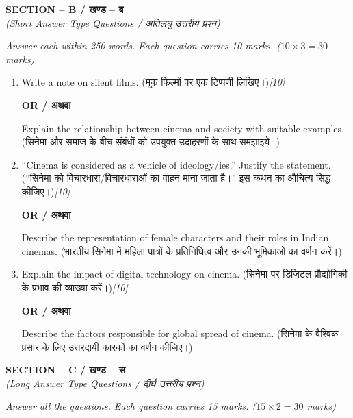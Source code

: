 \documentclass[11pt,a4paper]{article}
\newcommand{\pts}[1]{\hfill \textit{[#1]}}
\begin{document}
\bigskip

\begin{center}
  \textbf{SECTION -- B / खण्ड -- ब}\\
  \textit{(Short Answer Type Questions / अतिलघु उत्तरीय प्रश्न)}
\end{center}
\noindent \textit{Answer each within 250 words. Each question carries 10 marks. ($10 \times 3 = 30$ marks)}

\begin{enumerate}[label=\textbf{\arabic*.}, start=2]
  \item Write a note on silent films. (मूक फिल्मों पर एक टिप्पणी लिखिए।)\pts{10}\\
  \begin{center}\textbf{OR / अथवा}\end{center}
  Explain the relationship between cinema and society with suitable examples. (सिनेमा और समाज के बीच संबंधों को उपयुक्त उदाहरणों के साथ समझाइये।)

  \item ``Cinema is considered as a vehicle of ideology/ies.'' Justify the statement. (``सिनेमा को विचारधारा/विचारधाराओं का वाहन माना जाता है।'' इस कथन का औचित्य सिद्ध कीजिए।)\pts{10}\\
  \begin{center}\textbf{OR / अथवा}\end{center}
  Describe the representation of female characters and their roles in Indian cinemas. (भारतीय सिनेमा में महिला पात्रों के प्रतिनिधित्व और उनकी भूमिकाओं का वर्णन करें।)

  \item Explain the impact of digital technology on cinema. (सिनेमा पर डिजिटल प्रौद्योगिकी के प्रभाव की व्याख्या करें।)\pts{10}\\
  \begin{center}\textbf{OR / अथवा}\end{center}
  Describe the factors responsible for global spread of cinema. (सिनेमा के वैश्विक प्रसार के लिए उत्तरदायी कारकों का वर्णन कीजिए।)
\end{enumerate}

\bigskip

\begin{center}
  \textbf{SECTION -- C / खण्ड -- स}\\
  \textit{(Long Answer Type Questions / दीर्घ उत्तरीय प्रश्न)}
\end{center}
\noindent \textit{Answer all the questions. Each question carries 15 marks. ($15 \times 2 = 30$ marks)}
\end{document}
